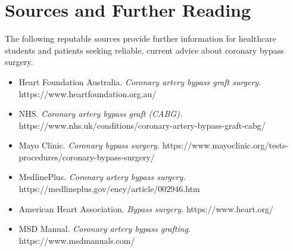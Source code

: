 \section*{Sources and Further Reading}
The following reputable sources provide further information for healthcare students and patients seeking reliable, current advice about coronary bypass surgery.

\begin{itemize}
    \item Heart Foundation Australia. \textit{Coronary artery bypass graft surgery.} https://www.heartfoundation.org.au/
    \item NHS. \textit{Coronary artery bypass graft (CABG).} https://www.nhs.uk/conditions/coronary-artery-bypass-graft-cabg/
    \item Mayo Clinic. \textit{Coronary bypass surgery.} https://www.mayoclinic.org/tests-procedures/coronary-bypass-surgery/
    \item MedlinePlus. \textit{Coronary artery bypass surgery.} https://medlineplus.gov/ency/article/002946.htm
    \item American Heart Association. \textit{Bypass surgery.} https://www.heart.org/
    \item MSD Manual. \textit{Coronary artery bypass grafting.} https://www.msdmanuals.com/
\end{itemize}
